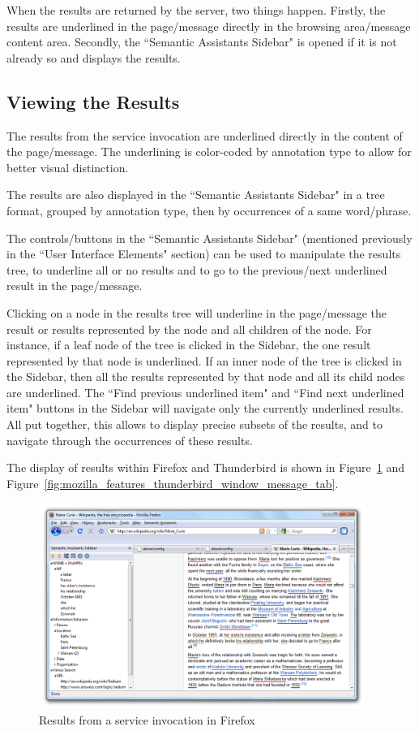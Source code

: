 When the results are returned by the server, two things happen. Firstly, the results are underlined in the page/message directly in the browsing area/message content area. Secondly, the ``Semantic Assistants Sidebar" is opened if it is not already so and displays the results. 

\subsection{Viewing the Results}
The results from the service invocation are underlined directly in the content of the page/message. The underlining is color-coded by annotation type to allow for better visual distinction. 

The results are also displayed in the ``Semantic Assistants Sidebar" in a tree format, grouped by annotation type, then by occurrences of a same word/phrase. 

The controls/buttons in the ``Semantic Assistants Sidebar" (mentioned previously in the ``User Interface Elements" section) can be used to manipulate the results tree, to underline all or no results and to go to the previous/next underlined result in the page/message.

Clicking on a node in the results tree will underline in the page/message the result or results represented by the node and all children of the node. For instance, if a leaf node of the tree is clicked in the Sidebar, the one result represented by that node is underlined. If an inner node of the tree is clicked in the Sidebar, then all the results represented by that node and all its child nodes are underlined. The ``Find previous underlined item" and ``Find next underlined item" buttons in the Sidebar will navigate only the currently underlined results. All put together, this allows to display precise subsets of the results, and to navigate through the occurrences of these results. 

The display of results within Firefox and Thunderbird is shown in Figure~\ref{fig:mozilla_features_firefox_window} and Figure~\ref{fig:mozilla_features_thunderbird_window_message_tab}.

\begin{figure}[htb]
  \centering
  \includegraphics[width=0.95\textwidth]{pictures/mozilla_features_firefox_window.png}
  \caption{Results from a service invocation in Firefox}
  \label{fig:mozilla_features_firefox_window}
\end{figure}

